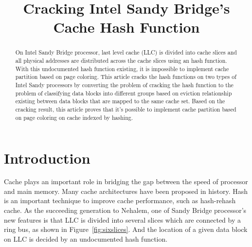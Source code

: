 \documentclass[conference]{IEEEtran}
\begin{document}
\title{\huge{\textbf{Cracking Intel Sandy Bridge's Cache Hash Function}}}


\author{




}












\maketitle


\begin{abstract}
On Intel Sandy Bridge processor, last level cache (LLC) is divided into cache slices and all physical addresses are distributed across the cache slices using an hash function. 
With this undocumented hash function existing, it is impossible to implement cache partition based on page coloring.
This article cracks the hash functions on two types of Intel Sandy processors by converting the problem of cracking the hash function to the problem of classifying data blocks into different groups based on eviction relationship existing between data blocks that are mapped to the same cache set.
Based on the cracking result, this article proves that it's possible to implement cache partition based on page coloring on cache indexed by hashing.
\end{abstract}




\IEEEpeerreviewmaketitle

\section{Introduction}
Cache plays an important role in bridging the gap between the speed of processor and main memory. Many cache architectures have been proposed in history. Hash is an important technique to improve cache performance, such as hash-rehash cache. As the succeeding generation to Nehalem, one of Sandy Bridge processor's new features is that LLC is divided into several slices which are connected by a ring bus, as shown in Figure~\ref{fig:sixslices}. And the location of a given data block on LLC is decided by an undocumented hash function.  
\end{document}
